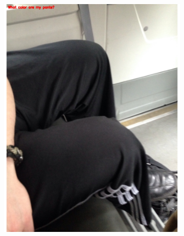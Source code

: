 \documentclass[sigconf]{acmart}
\begin{document}
\begin{figure}[hbp]
        \centering
        \begin{subfigure}[b]{0.3\columnwidth}
                \includegraphics[scale=0.3]{images/color_1.pdf}  
        \end{subfigure}%
        ~ 
        \begin{subfigure}[b]{0.3\columnwidth}

\end{subfigure}
\end{figure}
\end{document}
